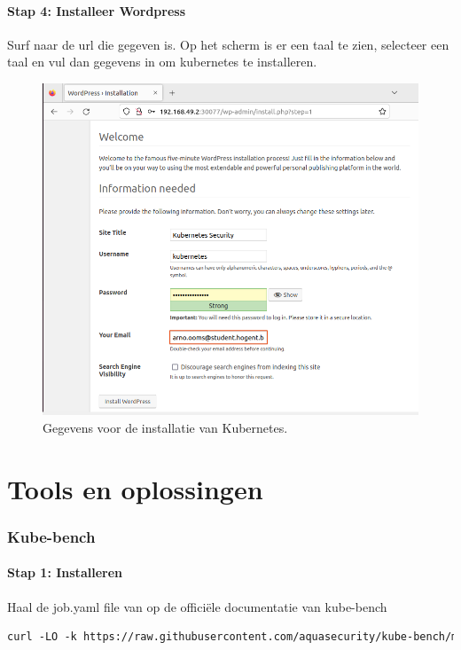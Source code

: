 \paragraph{Stap 4: Installeer Wordpress}

Surf naar de url die gegeven is. Op het scherm is er een taal te zien, selecteer een taal en vul dan gegevens in om kubernetes te installeren. 
\begin{flushleft}
    \begin{figure}[h]
        \includegraphics[width=.80\textwidth]{graphics/installeer-wordpress.png}
        \caption{\label{fig:InstallatieKubernetes}Gegevens voor de installatie van Kubernetes.}
    \end{figure} 
\end{flushleft}

\section{Tools en oplossingen}
\subsubsection{Kube-bench}

\paragraph{Stap 1: Installeren}

Haal de job.yaml file van op de officiële documentatie van kube-bench
\begin{lstlisting}[language=tex, caption={Job.yaml halen van documentatie}]
curl -LO -k https://raw.githubusercontent.com/aquasecurity/kube-bench/main/job.yaml
\end{lstlisting}

